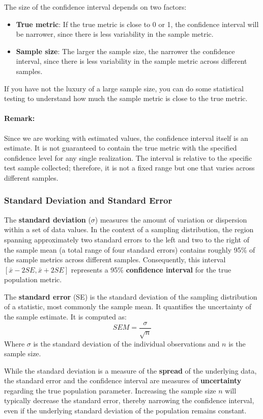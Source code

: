 The size of the confidence interval depends on two factors:
\begin{itemize}
    \item \textbf{True metric}: If the true metric is close to 0 or 1, the confidence interval will be narrower, since there is less variability in the sample metric.
    \item \textbf{Sample size}: The larger the sample size, the narrower the confidence interval, since there is less variability in the sample metric across different samples.
\end{itemize}
If you have not the luxury of a large sample size, you can do some statistical testing to understand how much the sample metric is close to the true metric.

\paragraph{Remark:} Since we are working with estimated values, the confidence interval itself is an estimate. 
It is not guaranteed to contain the true metric with the specified confidence level for any single realization. 
The interval is relative to the specific test sample collected; therefore, it is not a fixed range but one that varies across different samples.

\subsubsection*{Standard Deviation and Standard Error}
The \textbf{standard deviation} ($\sigma$) measures the amount of variation or dispersion 
within a set of data values. 
In the context of a sampling distribution, the region spanning approximately two standard errors to the left 
and two to the right of the sample mean (a total range of four standard errors) 
contains roughly 95\% of the sample metrics across different samples.
Consequently, this interval $[\bar{x} - 2SE, \bar{x} + 2SE]$ represents a 95\% \textbf{confidence interval} for the true population metric.

The \textbf{standard error} (SE) is the standard deviation of the sampling distribution of a statistic, 
most commonly the sample mean. It quantifies the uncertainty of the sample estimate. It is computed as:
\[
    SEM = \frac{\sigma}{\sqrt{n}}
\]
Where $\sigma$ is the standard deviation of the individual observations and $n$ is the sample size.

While the standard deviation is a measure of the \textbf{spread} of the underlying data, 
the standard error and the confidence interval are measures of \textbf{uncertainty} 
regarding the true population parameter. 
Increasing the sample size $n$ will typically decrease the standard error, thereby narrowing the confidence interval, even if the underlying standard deviation of the population remains constant.

